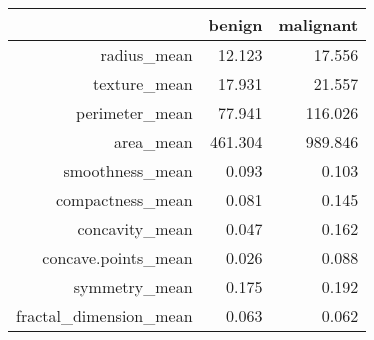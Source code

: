 \begin{table}[H]
\centering
\begin{tabular}{r|rr}
 & benign & malignant \\ 
  \hline
radius\_mean & 12.123 & 17.556 \\ 
  texture\_mean & 17.931 & 21.557 \\ 
  perimeter\_mean & 77.941 & 116.026 \\ 
  area\_mean & 461.304 & 989.846 \\ 
  smoothness\_mean & 0.093 & 0.103 \\ 
  compactness\_mean & 0.081 & 0.145 \\ 
  concavity\_mean & 0.047 & 0.162 \\ 
  concave.points\_mean & 0.026 & 0.088 \\ 
  symmetry\_mean & 0.175 & 0.192 \\ 
  fractal\_dimension\_mean & 0.063 & 0.062 \\ 
\end{tabular}
\end{table}